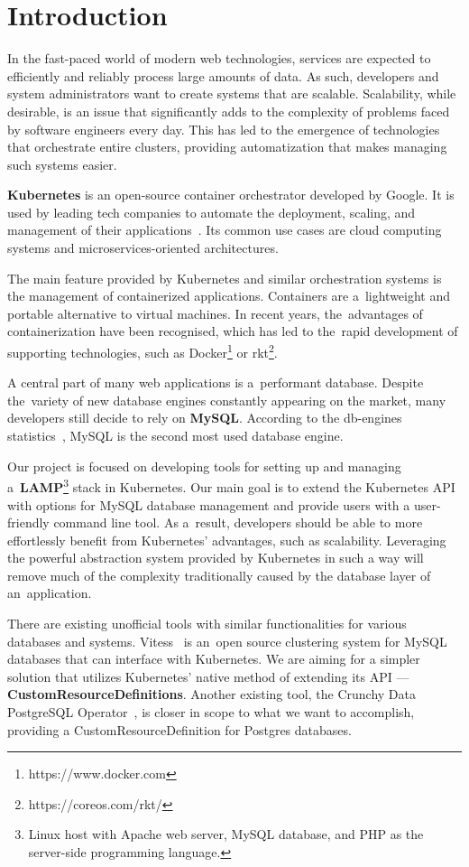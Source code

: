 \chapter{Introduction}
In the fast-paced world of modern web technologies, services are expected to
efficiently and reliably process large amounts of data. As such, developers
and system administrators want to create systems that are scalable. Scalability,
while desirable, is an issue that significantly adds to the complexity of
problems faced by software engineers every day. This has led to the emergence of
technologies that orchestrate entire clusters, providing automatization that
makes managing such systems easier.

\textbf{Kubernetes} is an open-source container orchestrator developed by
Google. It is used by leading tech companies to automate the deployment,
scaling, and management of their applications~\cite{kube-usecase}. Its common
use cases are cloud computing systems and microservices-oriented architectures.

The main feature provided by Kubernetes and similar orchestration
systems is the management of containerized applications. Containers are
a~lightweight and portable alternative to virtual machines. In recent years,
the~advantages of containerization have been recognised, which has led to
the~rapid development of supporting technologies, such as Docker\footnote{https://www.docker.com}
or rkt\footnote{https://coreos.com/rkt/}.

A central part of many web applications is a~performant database. Despite
the~variety of new database engines constantly appearing on the market, many
developers still decide to rely on \textbf{MySQL}. According to the db-engines
statistics~\cite{db-eng}, MySQL is the second most used database
engine.

Our project is focused on developing tools for setting up and managing
a~\textbf{LAMP}\footnote{Linux host with Apache web server, MySQL database,
and PHP as the server-side programming language.} stack in Kubernetes. Our main goal is to
extend the Kubernetes API with options for MySQL database
management and provide users with a user-friendly command line tool. As
a~result, developers should be able to more effortlessly benefit from
Kubernetes' advantages, such as scalability. Leveraging the powerful
abstraction system provided by Kubernetes in such a way will remove
much of the complexity traditionally caused by the database layer of
an~application.

There are existing unofficial tools with similar functionalities for various
databases and systems. Vitess~\cite{vitess} is an~open source
clustering system for MySQL databases that can interface with
Kubernetes. We are aiming for a simpler solution that utilizes
Kubernetes' native method of extending its API ---
\textbf{CustomResourceDefinitions}. Another existing tool,
the Crunchy Data PostgreSQL Operator~\cite{psql-op}, is closer in scope to what we want to
accomplish, providing a CustomResourceDefinition for Postgres databases.

